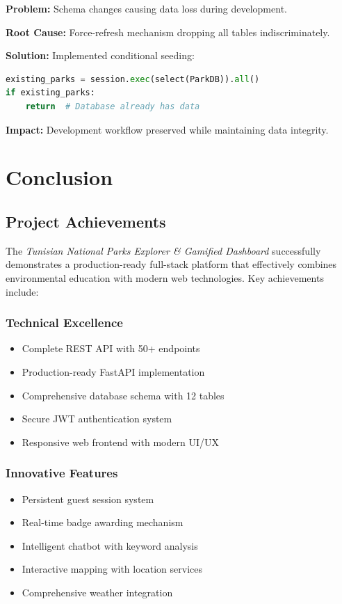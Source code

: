 \documentclass[11pt,a4paper]{article}
\begin{document}
\textbf{Problem:} Schema changes causing data loss during development.

\textbf{Root Cause:} Force-refresh mechanism dropping all tables indiscriminately.

\textbf{Solution:} Implemented conditional seeding:
\begin{lstlisting}[language=Python]
existing_parks = session.exec(select(ParkDB)).all()
if existing_parks:
    return  # Database already has data
\end{lstlisting}

\textbf{Impact:} Development workflow preserved while maintaining data integrity.

\newpage

\section{Conclusion}
\label{sec:conclusion}

\subsection{Project Achievements}

The \textit{Tunisian National Parks Explorer \& Gamified Dashboard} successfully demonstrates a production-ready full-stack platform that effectively combines environmental education with modern web technologies. Key achievements include:

\subsubsection{Technical Excellence}
\begin{itemize}
    \item Complete REST API with 50+ endpoints
    \item Production-ready FastAPI implementation
    \item Comprehensive database schema with 12 tables
    \item Secure JWT authentication system
    \item Responsive web frontend with modern UI/UX
\end{itemize}

\subsubsection{Innovative Features}
\begin{itemize}
    \item Persistent guest session system
    \item Real-time badge awarding mechanism
    \item Intelligent chatbot with keyword analysis
    \item Interactive mapping with location services
    \item Comprehensive weather integration
\end{itemize}
\end{document}
